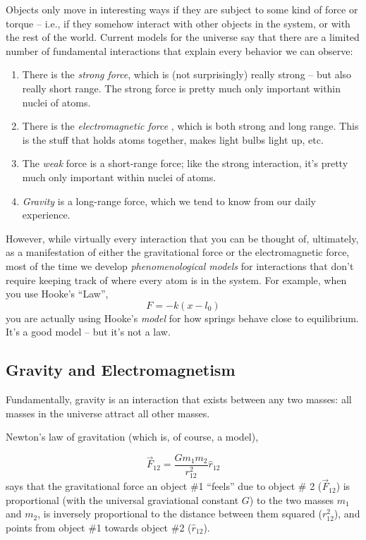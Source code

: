Objects only move in interesting ways if they are subject to some kind of force or torque -- i.e., if they somehow interact with other objects in the system, or with the rest of the world.  Current models for the universe say that there are a limited number of fundamental interactions that explain every behavior we can observe:
\begin{enumerate}
\item There is the {\it strong force}, which is (not surprisingly) really strong -- but also really short range.  The strong force is pretty much only important within nuclei of atoms.
\item There is the {\it electromagnetic force} , which is both strong and long range.  This is the stuff that holds atoms together, makes light bulbs light up, etc.
\item The {\it weak} force is a short-range force; like the strong interaction, it's pretty much only important within nuclei of atoms.
\item {\it Gravity} is a long-range force, which we tend to know from our daily experience.
\end{enumerate}

However, while virtually every interaction that you can be thought of, ultimately, as a manifestation of either the gravitational force or the electromagnetic force, most of the time we develop {\it phenomenological models} for interactions that don't require keeping track of where every atom is in the system.  For example, when you use Hooke's ``Law'',
$$ F = - k (x-l_0)$$
you are actually using Hooke's {\it model} for how springs behave close to equilibrium.  It's a good model -- but it's not a law. 

\subsection{Gravity and Electromagnetism}
Fundamentally, gravity is an interaction that exists between any two masses:  all masses in the universe attract all other masses.

Newton's law of gravitation (which is, of course, a model),

$$\vec{F}_{12}=\frac{Gm_1m_2}{r_{12}^2}\hat{r}_{12}$$
says 
 that the gravitational force an object \#1 ``feels'' due to object \# 2 ($\vec{F}_{12}$) is proportional (with the universal graviational constant $G$) to the two masses $m_1$ and $m_2$, is inversely proportional to the distance between them squared ($r_{12}^2$), and points from object \#1 towards object \#2 ($\hat{r}_{12}$).  
 
